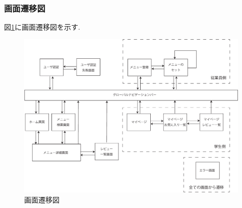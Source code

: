 \documentclass[a4paper]{ltjsarticle}
\begin{document}
    \subsubsection{画面遷移図}
        図\ref{img:transition}に画面遷移図を示す.
        \begin{figure}[ht]
            \center
            \includegraphics[width=145mm]{fig/transition.pdf}
            \caption{画面遷移図}
            \label{img:transition}
        \end{figure}
\end{document}
